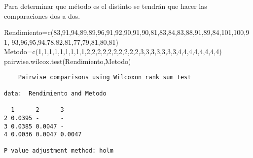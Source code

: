 \documentclass[
  a4paper,
  oneside,
  openany]{book}
\newenvironment{Shaded}{\begin{snugshade}}{\end{snugshade}}
\newcommand{\DecValTok}[1]{\textcolor[rgb]{0.00,0.00,0.81}{#1}}
\newcommand{\FunctionTok}[1]{\textcolor[rgb]{0.00,0.00,0.00}{#1}}
\newcommand{\NormalTok}[1]{#1}
\newcommand{\OtherTok}[1]{\textcolor[rgb]{0.56,0.35,0.01}{#1}}
\begin{document}
Para determinar que método es el distinto se tendrán que hacer las comparaciones dos a dos.

\begin{Shaded}
\begin{Highlighting}[]
\NormalTok{Rendimiento}\OtherTok{=}\FunctionTok{c}\NormalTok{(}\DecValTok{83}\NormalTok{,}\DecValTok{91}\NormalTok{,}\DecValTok{94}\NormalTok{,}\DecValTok{89}\NormalTok{,}\DecValTok{89}\NormalTok{,}\DecValTok{96}\NormalTok{,}\DecValTok{91}\NormalTok{,}\DecValTok{92}\NormalTok{,}\DecValTok{90}\NormalTok{,}\DecValTok{91}\NormalTok{,}\DecValTok{90}\NormalTok{,}\DecValTok{81}\NormalTok{,}\DecValTok{83}\NormalTok{,}\DecValTok{84}\NormalTok{,}\DecValTok{83}\NormalTok{,}\DecValTok{88}\NormalTok{,}\DecValTok{91}\NormalTok{,}\DecValTok{89}\NormalTok{,}\DecValTok{84}\NormalTok{,}\DecValTok{101}\NormalTok{,}\DecValTok{100}\NormalTok{,}\DecValTok{91}\NormalTok{,}
              \DecValTok{93}\NormalTok{,}\DecValTok{96}\NormalTok{,}\DecValTok{95}\NormalTok{,}\DecValTok{94}\NormalTok{,}\DecValTok{78}\NormalTok{,}\DecValTok{82}\NormalTok{,}\DecValTok{81}\NormalTok{,}\DecValTok{77}\NormalTok{,}\DecValTok{79}\NormalTok{,}\DecValTok{81}\NormalTok{,}\DecValTok{80}\NormalTok{,}\DecValTok{81}\NormalTok{)}
\NormalTok{Metodo}\OtherTok{=}\FunctionTok{c}\NormalTok{(}\DecValTok{1}\NormalTok{,}\DecValTok{1}\NormalTok{,}\DecValTok{1}\NormalTok{,}\DecValTok{1}\NormalTok{,}\DecValTok{1}\NormalTok{,}\DecValTok{1}\NormalTok{,}\DecValTok{1}\NormalTok{,}\DecValTok{1}\NormalTok{,}\DecValTok{1}\NormalTok{,}\DecValTok{2}\NormalTok{,}\DecValTok{2}\NormalTok{,}\DecValTok{2}\NormalTok{,}\DecValTok{2}\NormalTok{,}\DecValTok{2}\NormalTok{,}\DecValTok{2}\NormalTok{,}\DecValTok{2}\NormalTok{,}\DecValTok{2}\NormalTok{,}\DecValTok{2}\NormalTok{,}\DecValTok{2}\NormalTok{,}\DecValTok{3}\NormalTok{,}\DecValTok{3}\NormalTok{,}\DecValTok{3}\NormalTok{,}\DecValTok{3}\NormalTok{,}\DecValTok{3}\NormalTok{,}\DecValTok{3}\NormalTok{,}\DecValTok{3}\NormalTok{,}\DecValTok{4}\NormalTok{,}\DecValTok{4}\NormalTok{,}\DecValTok{4}\NormalTok{,}\DecValTok{4}\NormalTok{,}\DecValTok{4}\NormalTok{,}\DecValTok{4}\NormalTok{,}\DecValTok{4}\NormalTok{,}\DecValTok{4}\NormalTok{)}
\FunctionTok{pairwise.wilcox.test}\NormalTok{(Rendimiento,Metodo)}
\end{Highlighting}
\end{Shaded}

\begin{verbatim}
    Pairwise comparisons using Wilcoxon rank sum test 

data:  Rendimiento and Metodo 

  1      2      3     
2 0.0395 -      -     
3 0.0385 0.0047 -     
4 0.0036 0.0047 0.0047

P value adjustment method: holm 
\end{verbatim}
\end{document}
